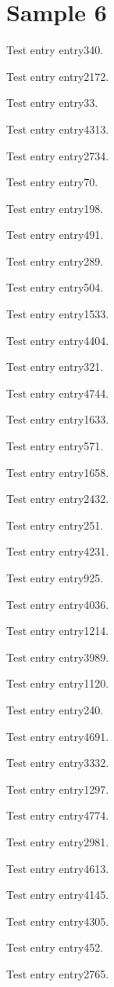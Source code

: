\chapter{Sample 6}
Test entry \gls{entry340}.

Test entry \gls{entry2172}.

Test entry \gls{entry33}.

Test entry \gls{entry4313}.

Test entry \gls{entry2734}.

Test entry \gls{entry70}.

Test entry \gls{entry198}.

Test entry \gls{entry491}.

Test entry \gls{entry289}.

Test entry \gls{entry504}.

Test entry \gls{entry1533}.

Test entry \gls{entry4404}.

Test entry \gls{entry321}.

Test entry \gls{entry4744}.

Test entry \gls{entry1633}.

Test entry \gls{entry571}.

Test entry \gls{entry1658}.

Test entry \gls{entry2432}.

Test entry \gls{entry251}.

Test entry \gls{entry4231}.

Test entry \gls{entry925}.

Test entry \gls{entry4036}.

Test entry \gls{entry1214}.

Test entry \gls{entry3989}.

Test entry \gls{entry1120}.

Test entry \gls{entry240}.

Test entry \gls{entry4691}.

Test entry \gls{entry3332}.

Test entry \gls{entry1297}.

Test entry \gls{entry4774}.

Test entry \gls{entry2981}.

Test entry \gls{entry4613}.

Test entry \gls{entry4145}.

Test entry \gls{entry4305}.

Test entry \gls{entry452}.

Test entry \gls{entry2765}.

